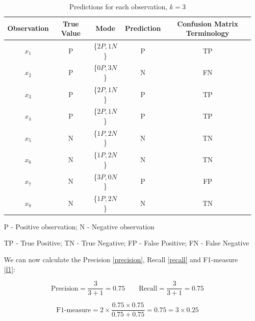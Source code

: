 \documentclass[12pt]{article}
\begin{document}
\begin{enumerate}[leftmargin=\labelsep]
    \begin{table}[H]
        \begin{center}
            \begin{threeparttable}
            \begin{tabular}{c|c|c|c|c}
                Observation & True Value & Mode & Prediction & Confusion Matrix Terminology\\
                \hline
                $x_1$ & P &\{$2P, 1N$\}& P & TP\\
                $x_2$ & P &\{$0P, 3N$\}& N & FN\\
                $x_3$ & P &\{$2P, 1N$\}& P & TP\\
                $x_4$ & P &\{$2P, 1N$\}& P & TP\\
                $x_5$ & N &\{$1P, 2N$\}& N & TN\\
                $x_6$ & N &\{$1P, 2N$\}& N & TN\\
                $x_7$ & N &\{$3P, 0N$\}& P & FP\\
                $x_8$ & N &\{$1P, 2N$\}& N & TN\\
            \end{tabular}
            \begin{tablenotes}
                \small
                \item[]
                \item[P - Positive observation; N - Negative observation]  
                \item[TP - True Positive; TN - True Negative; FP - False Positive; FN - False Negative] 
                \item[] 
            \end{tablenotes}
        \end{threeparttable}
            \caption{Predictions for each observation, $k=3$}
        \end{center}
    \end{table}

    We can now calculate the Precision \eqref{precision}, Recall \eqref{recall} and F1-measure \eqref{f1}:
    
    \begin{equation*}
        \text{Precision} = \frac{3}{3 + 1} =  0.75 \quad \quad
        \text{Recall} = \frac{3}{3 + 1} = 0.75
    \end{equation*}

    \begin{equation*}
        \text{F1-measure} = 2 \times \frac{0.75 \times 0.75}{0.75 + 0.75} = 0.75 = 3\times0.25
    \end{equation*}



\end{enumerate}
\end{document}
